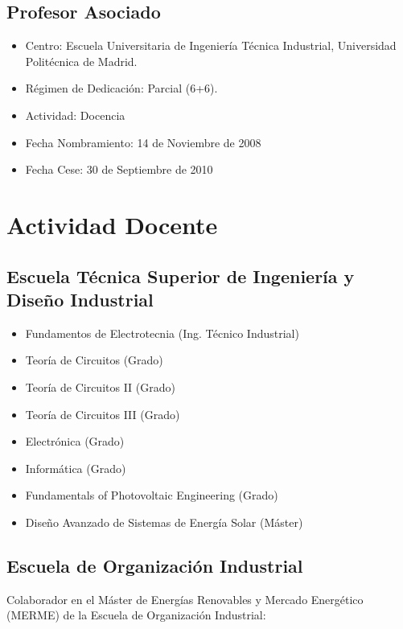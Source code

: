 \documentclass[article, a4paper]{memoir}
\begin{document}
\subsection{Profesor Asociado}
\label{sec:org7342f9b}
\begin{itemize}
\item Centro: Escuela Universitaria de Ingeniería Técnica Industrial, Universidad Politécnica de Madrid.
\item Régimen de Dedicación: Parcial (6+6).
\item Actividad: Docencia
\item Fecha Nombramiento: 14 de Noviembre de 2008
\item Fecha Cese: 30 de Septiembre de 2010
\end{itemize}

\newpage

\section{Actividad Docente}
\label{sec:org4c8a87a}
\subsection{Escuela Técnica Superior de Ingeniería y Diseño Industrial}
\label{sec:org37ddecb}

\begin{itemize}
\item Fundamentos de Electrotecnia (Ing. Técnico Industrial)
\item Teoría de Circuitos (Grado)
\item Teoría de Circuitos II (Grado)
\item Teoría de Circuitos III (Grado)
\item Electrónica (Grado)
\item Informática (Grado)
\item Fundamentals of Photovoltaic Engineering (Grado)
\item Diseño Avanzado de Sistemas de Energía Solar (Máster)
\end{itemize}

\subsection{Escuela de Organización Industrial}
\label{sec:org45f396d}

Colaborador en el Máster de Energías Renovables y Mercado Energético (MERME) de la Escuela de Organización Industrial:
\end{document}

